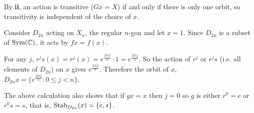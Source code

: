 \documentclass[../main.tex]{subfiles}
\begin{document}
\begin{remark}[Note]
  By \textbf{ii}, an action is transitive ($Gx = X$) if and only if there is only one orbit, so transitivity is independent of the choice of $x$.
\end{remark}
\begin{example}
  \label{dihedralAction}
  Consider $D_{2n}$ acting on $X_n$, the regular $n$-gon and let $x = 1$.
  Since $D_{2n}$ is a subset of $\operatorname{Sym}(\mathbb{C})$, it acts by $fx = f(x)$.

  For any $j$, $r^{j}s(x) = r^{j}(x) = e^{\frac{2 \pi i j}{n}} \cdot 1 = e^{\frac{2\pi i j}{n}}$.
  So the action of $r^{j}$ or $r^{j}s$ (i.e. all elements of $D_{2n}$) on $x$ gives $e^{\frac{2 \pi i j}{n}}$.
  Therefore the orbit of $x$, $D_{2n}x = \{e^{\frac{2 \pi i j}{n}} : 0 \leq j < n\}$.

  The above calculation also shows that if $gx = x$ then $j = 0$ so $g$ is either $r^{0} = e$ or $r^{0}s = s$, that is, $\operatorname{Stab}_{D_{2n}}(x) = \{e, s\}$.
\end{example}
\end{document}
